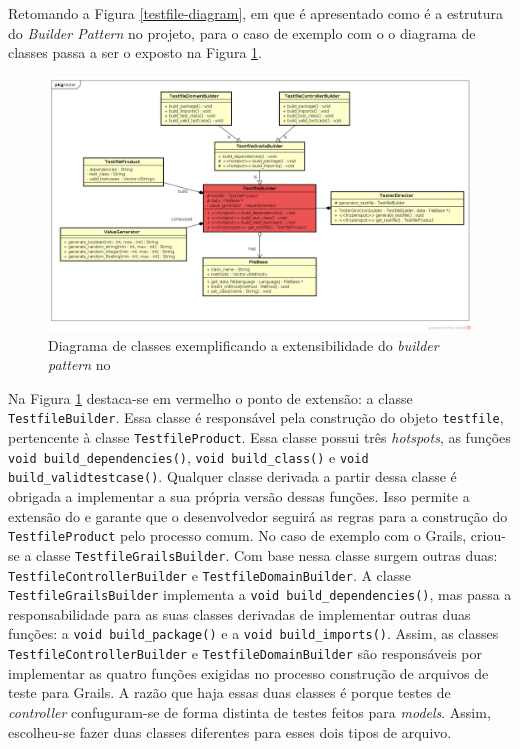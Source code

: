 Retomando a Figura \ref{testfile-diagram}, em que é apresentado como é a
estrutura do \textit{Builder Pattern} no projeto, para o caso de exemplo
com o \grails o diagrama de classes passa a ser o exposto na Figura
\ref{testfile-grails-class-diagram}.

\begin{figure}[h]
  \centering
    \includegraphics[width=\textwidth]{figuras/testfile-grails-class-diagram.png}
    \caption{Diagrama de classes exemplificando a extensibilidade do \textit{builder pattern} no \framework}
    \label{testfile-grails-class-diagram}
\end{figure}
\FloatBarrier

Na Figura \ref{testfile-grails-class-diagram} destaca-se em vermelho
o ponto de extensão: a classe \lstinline|TestfileBuilder|. Essa classe é responsável
pela construção do objeto \lstinline|testfile|, pertencente à classe
\lstinline|TestfileProduct|. Essa classe possui três \textit{hotspots}, as funções
\lstinline|void build_dependencies()|, \lstinline|void build_class()| e
\lstinline|void build_validtestcase()|. Qualquer classe derivada a partir dessa classe é
obrigada a implementar a sua própria versão dessas funções. Isso permite a extensão
do \framework e garante que o desenvolvedor seguirá as regras para a construção do
\lstinline|TestfileProduct| pelo processo comum. No caso de exemplo com o
\textsf{Grails}, criou-se a classe \lstinline|TestfileGrailsBuilder|. Com base
nessa classe surgem outras duas: \lstinline|TestfileControllerBuilder| e
\lstinline|TestfileDomainBuilder|. A classe \lstinline|TestfileGrailsBuilder|
implementa a \lstinline|void build_dependencies()|, mas passa a responsabilidade
para as suas classes derivadas de implementar outras duas funções: a
\lstinline|void build_package()| e a \lstinline|void build_imports()|. Assim,
as classes \lstinline|TestfileControllerBuilder| e \lstinline|TestfileDomainBuilder|
são responsáveis por implementar as quatro funções exigidas no processo
construção de arquivos de teste para \textsf{Grails}. A razão que haja essas
duas classes é porque testes de \textit{controller} confuguram-se de forma
distinta de testes feitos para \textit{models}. Assim, escolheu-se fazer duas classes
diferentes para esses dois tipos de arquivo.

